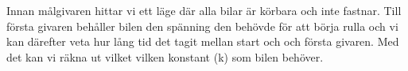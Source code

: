 Innan målgivaren hittar vi ett läge där alla bilar är körbara och inte fastnar. Till första givaren behåller bilen den spänning den behövde för att börja rulla och vi kan därefter veta hur lång tid det tagit mellan start och och första givaren. Med det kan vi räkna ut vilket vilken konstant (k) som bilen behöver. 